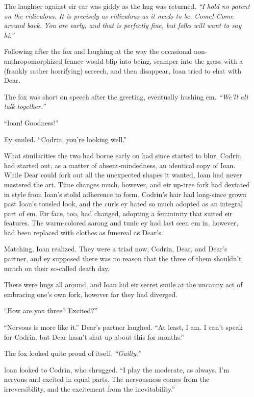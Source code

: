 The laughter against eir ear was giddy as the hug was returned. \emph{``I hold no patent on the ridiculous. It is precisely as ridiculous as it needs to be. Come! Come around back. You are early, and that is perfectly fine, but folks will want to say hi.''}

Following after the fox and laughing at the way the occasional non-anthropomorphized fennec would blip into being, scamper into the grass with a (frankly rather horrifying) screech, and then disappear, Ioan tried to chat with Dear.

The fox was short on speech after the greeting, eventually hushing em. \emph{``We'll all talk together.''}

``Ioan! Goodness!''

Ey smiled. ``Codrin, you're looking well.''

What similarities the two had borne early on had since started to blur. Codrin had started out, as a matter of absent-mindedness, an identical copy of Ioan. While Dear could fork out all the unexpected shapes it wanted, Ioan had never mastered the art. Time changes much, however, and eir up-tree fork had deviated in style from Ioan's stolid adherence to form. Codrin's hair had long-since grown past Ioan's tousled look, and the curls ey hated so much adopted as an integral part of em. Eir face, too, had changed, adopting a femininity that suited eir features. The warm-colored sarong and tunic ey had last seen em in, however, had been replaced with clothes as funereal as Dear's.

Matching, Ioan realized. They were a triad now, Codrin, Dear, and Dear's partner, and ey supposed there was no reason that the three of them shouldn't match on their so-called death day.

There were hugs all around, and Ioan hid eir secret smile at the uncanny act of embracing one's own fork, however far they had diverged.

``How are you three? Excited?''

``Nervous is more like it.'' Dear's partner laughed. ``At least, I am. I can't speak for Codrin, but Dear hasn't shut up about this for months.''

The fox looked quite proud of itself. \emph{``Guilty.''}

Ioan looked to Codrin, who shrugged. ``I play the moderate, as always. I'm nervous and excited in equal parts. The nervousness comes from the irreversibility, and the excitement from the inevitability.''

